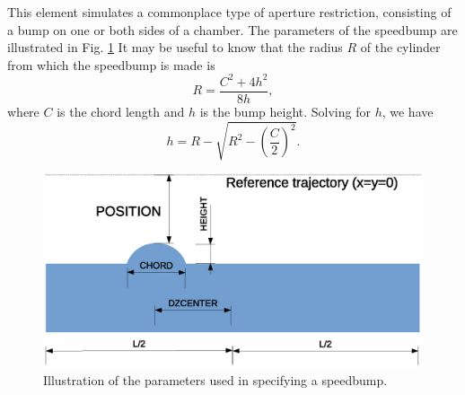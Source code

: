 This element simulates a commonplace type of aperture restriction, consisting of a
bump on one or both sides of a chamber. The parameters of the speedbump are
illustrated in Fig. \ref{fig:speedbump}
It may be useful to know that the radius $R$ of the cylinder from which the
speedbump is made is
\begin{equation}
  R = \frac{C^2 + 4 h^2}{8 h},
\end{equation}
where $C$ is the chord length and $h$ is the bump height.
Solving for $h$, we have
\begin{equation}
h = R - \sqrt{R^2 - \left(\frac{C}{2}\right)^2}.
\end{equation}

\begin{figure}[htb]
\center
\includegraphics[width=0.8\linewidth]{speedbump}
\caption{Illustration of the parameters used in specifying a speedbump.}
\label{fig:speedbump}
\end{figure}

\clearpage
